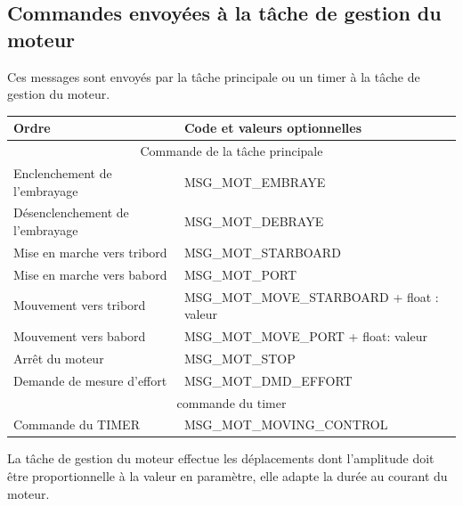 \documentclass[a4paper,11pt]{report}
\begin{document}
\subsection{Commandes envoyées à la tâche de gestion du moteur}
Ces messages sont envoyés par la tâche principale ou un timer
à la tâche de gestion du moteur.
\\
\begin{tabular}{|l|l|}
	\hline 
	Ordre & Code et valeurs optionnelles \\ 
	\hline
	\multicolumn{2}{|c|}{Commande de la tâche principale} \\
	\hline 
    Enclenchement de l'embrayage & MSG\_MOT\_EMBRAYE\\
    Désenclenchement de l'embrayage & MSG\_MOT\_DEBRAYE\\
    Mise en marche vers tribord & MSG\_MOT\_STARBOARD\\
    Mise en marche vers babord  & MSG\_MOT\_PORT\\
    Mouvement vers tribord & MSG\_MOT\_MOVE\_STARBOARD + float : valeur\\
    Mouvement vers babord  & MSG\_MOT\_MOVE\_PORT + float: valeur\\
    Arrêt du moteur & MSG\_MOT\_STOP\\
    Demande de mesure d'effort & MSG\_MOT\_DMD\_EFFORT\\
    \hline
	\multicolumn{2}{|c|}{commande du timer} \\
	\hline
	Commande du TIMER & MSG\_MOT\_MOVING\_CONTROL\\
    \hline
\end{tabular} 

La tâche de gestion du moteur effectue les déplacements
dont l'amplitude doit être proportionnelle à la valeur en paramètre,
elle adapte la durée au courant du moteur.
\end{document}
